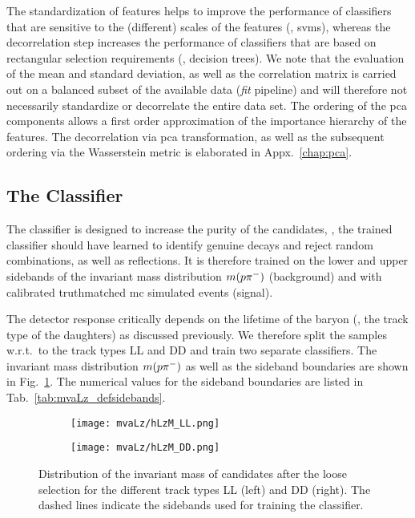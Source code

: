 The standardization of features helps to improve the performance of classifiers that are sensitive to the (different) scales of the features (\eg{}, \glspl{svm}), whereas the decorrelation step increases the performance of classifiers that are based on rectangular selection requirements (\eg{}, decision trees).
We note that the evaluation of the mean and standard deviation, as well as the correlation matrix is carried out on a balanced subset of the available data (\textit{fit} pipeline) and will therefore not necessarily standardize or decorrelate the entire data set.
The ordering of the \gls{pca} components allows a first order approximation of the importance hierarchy of the features.
The decorrelation via \gls{pca} transformation, as well as the subsequent ordering via the Wasserstein metric is elaborated in Appx.~\ref{chap:pca}.

\subsection{The \texorpdfstring{\Lz}{Λ} Classifier}
\label{sec:LbToDzLz_mvaLz}
The \Lz classifier is designed to increase the purity of the \Lz candidates, \ie{}, the trained classifier should have learned to identify genuine \decay{\Lz}{\proton\pim} decays and reject random combinations, as well as \glspl{reflection}.
It is therefore trained on the lower and upper sidebands of the invariant mass distribution $m({p}{{\pi}^-})$ (background) and with calibrated \gls{truthmatched} \gls{mc} simulated events (signal).

The detector response critically depends on the lifetime of the \Lz baryon (\ie{}, the track type of the \Lz daughters) as discussed previously.
We therefore split the samples w.r.t.\ to the track types \gls{LL} and \gls{DD} and train two separate classifiers.
The invariant mass distribution $m({p}{{\pi}^-})$ as well as the sideband boundaries are shown in Fig.~\ref{fig:mvaLz_hLzM}.
The numerical values for the sideband boundaries are listed in Tab.~\ref{tab:mvaLz_defsidebands}.
\begin{figure}[htbp]
    \centering
    \begin{subfigure}[b]{.49\textwidth}
        \centering
        \texttt{[image: mvaLz/hLzM\_LL.png]}
    \end{subfigure}
    \begin{subfigure}[b]{.49\textwidth}
        \centering
        \texttt{[image: mvaLz/hLzM\_DD.png]}
    \end{subfigure}
    \caption{Distribution of the invariant mass of \Lz candidates after the loose selection for the different track types \gls{LL} (left) and \gls{DD} (right). The dashed lines indicate the sidebands used for training the \Lz classifier.}
    \label{fig:mvaLz_hLzM}
\end{figure}

